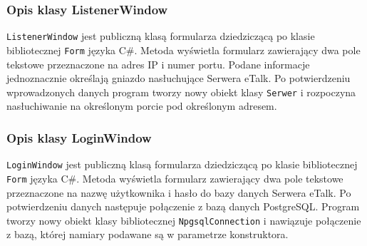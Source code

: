 \documentclass[a4paper,12pt]{article}
\begin{document}
\subsubsection[Opis klasy ListenerWindow]{Opis klasy ListenerWindow}
\texttt{ListenerWindow} jest publiczną klasą formularza dziedziczącą po klasie bibliotecznej \texttt{Form}
języka C\#. Metoda wyświetla formularz zawierający dwa pole tekstowe przeznaczone na adres IP i numer portu.
Podane informacje jednoznacznie określają gniazdo nasłuchujące Serwera eTalk. Po potwierdzeniu wprowadzonych danych
program tworzy nowy obiekt klasy \texttt{Serwer} i rozpoczyna nasłuchiwanie na określonym porcie pod określonym adresem.

\subsubsection[Opis klasy LoginWindow]{Opis klasy LoginWindow}
\texttt{LoginWindow} jest publiczną klasą formularza dziedziczącą po klasie bibliotecznej \texttt{Form}
języka C\#. Metoda wyświetla formularz zawierający dwa pole tekstowe przeznaczone na nazwę użytkownika i hasło do bazy danych Serwera eTalk. Po potwierdzeniu danych następuje połączenie z bazą danych PostgreSQL.
Program tworzy nowy obiekt klasy bibliotecznej \texttt{NpgsqlConnection} i nawiązuje połączenie z bazą, której namiary podawane są w parametrze konstruktora.
\end{document}

